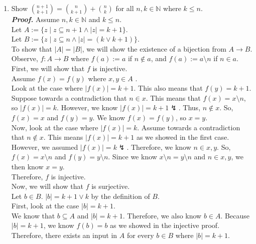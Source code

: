 \documentclass[11pt,a4paper]{article}
\begin{document}
\begin{enumerate}
\begin{enumerate}
        \item 
        Show  $\binom{n + 1}{k + 1} = \binom{n}{k + 1} + \binom{n}{k} $ for all $n, k \in \mathbb{N} $ where $k \leq n $. \\
        \emph{\textbf{Proof.}} Assume $n, k \in \mathbb{N}  $ and $k \leq n $. \\
        Let $A := \{z \mid z \subseteq n + 1 \land |z| = k + 1 \} $. \\
        Let $B := \{z \mid z \subseteq n \land |z| = (k \lor k + 1) \} $. \\
        To show that $|A| = |B|$, we will show the existence of a bijection from $A \rightarrow B $. \\
        Observe,  $f: A \rightarrow B$ where $f(a) := a$ if $n \notin a $, and $f(a) := a \setminus n $ if $n \in a$. \\
        First, we will show that $f$ is injective. \\
        Assume $f(x) = f(y)$ where $x, y \in A $ . \\ 
        Look at the case where $|f(x) | = k + 1$. This also means that $f(y) = k + 1 $. \\
        Suppose towards a contradiction that $n \in x $. This means that $f(x) = x \setminus n $, so $|f(x)| = k $. However, we know $|f(x)| = k + 1 \lightning$. Thus, $n \notin x $. 
        So, $f(x) = x $ and $f(y) = y $. We know $f(x) = f(y) $, so $x = y$. \\
        Now, look at the case where $|f(x)| = k  $. Assume towards a contradiction that $n \notin x $. This means $|f(x)| = k + 1 $ as we showed in the first case. However, we assumed $|f(x)| = k \lightning$. 
        Therefore, we know $n \in x, y$. So, $f(x) = x \setminus n $ and $f(y) = y \setminus n $. Since we know $x \setminus n = y \setminus n $ and $n \in x, y $, we then know $x = y $. \\
        Therefore, $f$ is injective. \\
        Now, we will show that $f$ is surjective. \\
        Let $b \in B $. $|b| = k + 1 \lor k $ by the definition of $B$. \\
        First, look at the case $|b| = k + 1$. \\
        We know that $b \subseteq A $ and $|b| = k + 1 $. Therefore, we also know $b \in A$. Because $|b| = k + 1 $, we know $f(b) = b $ as we showed in the injective proof. 
        Therefore, there exists an input in $A$ for every $b \in B $ where $|b| = k + 1$. \\

\end{enumerate}
\end{enumerate}
\end{document}
